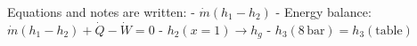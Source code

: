 Equations and notes are written:  
- \( \dot{m} (h_1 - h_2) \)  
- Energy balance: \( \dot{m} (h_1 - h_2) + \dot{Q} - \dot{W} = 0 \)  
- \( h_2 (x = 1) \rightarrow h_g \)  
- \( h_3 (8 \, \text{bar}) = h_3 (\text{table}) \)
